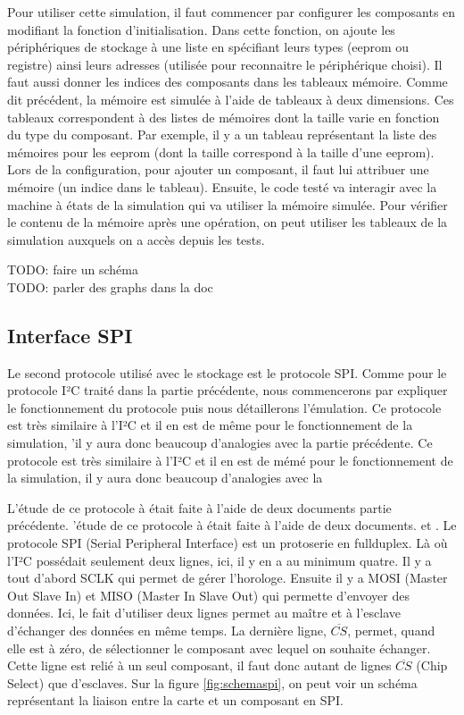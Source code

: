 \documentclass[a4paper]{article}
\begin{document}
Pour utiliser cette simulation, il faut commencer par configurer les composants
en modifiant la fonction d'initialisation. Dans cette fonction, on ajoute les
périphériques de stockage à une liste en spécifiant leurs types (eeprom ou
registre) ainsi leurs adresses (utilisée pour reconnaitre le périphérique
choisi). Il faut aussi donner les indices des composants dans les tableaux
mémoire. Comme dit précédent, la mémoire est simulée à l'aide de tableaux à deux
dimensions. Ces tableaux correspondent à des listes de mémoires dont la taille
varie en fonction du type du composant. Par exemple, il y a un tableau
représentant la liste des mémoires pour les eeprom (dont la taille correspond à
la taille d'une eeprom). Lors de la configuration, pour ajouter un composant, il
faut lui attribuer une mémoire (un indice dans le tableau). Ensuite, le code
testé va interagir avec la machine à états de la simulation qui va utiliser la
mémoire simulée. Pour vérifier le contenu de la mémoire après une opération, on
peut utiliser les tableaux de la simulation auxquels on a accès depuis les
tests.

TODO: faire un schéma\\
TODO: parler des graphs dans la doc

\subsection{Interface SPI}%

Le second protocole utilisé avec le stockage est le protocole SPI. Comme pour le
protocole I²C traité dans la partie précédente, nous commencerons par expliquer
le fonctionnement du protocole puis nous détaillerons l'émulation. Ce protocole
est très similaire à l'I²C et il en est de même pour le fonctionnement de la
simulation, 'il y aura donc beaucoup d'analogies avec la partie précédente.
Ce protocole est très similaire à l'I²C et il en est de mémé pour le
fonctionnement de la simulation, il y aura donc beaucoup d'analogies avec la

L'étude de ce protocole à était faite à l'aide de deux documents partie
précédente. 'étude de ce protocole à était faite à l'aide de deux documents.
\cite{dhaker2018introduction} et \cite{li2014design}. Le protocole SPI (Serial
Peripheral Interface) est un \gls{protoserie} en \gls{fullduplex}. Là où l'I²C
possédait seulement deux lignes, ici, il y en a au minimum quatre. Il y a tout
d'abord SCLK qui permet de gérer l'horologe. Ensuite il y a MOSI (Master Out
Slave In) et MISO (Master In Slave Out) qui permette d'envoyer des données. Ici,
le fait d'utiliser deux lignes permet au maître et à l'esclave d'échanger des
données en même temps. La dernière ligne, $\overline{CS}$, permet, quand elle
est à zéro, de sélectionner le composant avec lequel on souhaite échanger. Cette
ligne est relié à un seul composant, il faut donc autant de lignes
$\overline{CS}$ (Chip Select) que d'esclaves. Sur la figure \ref{fig:schemaspi},
on peut voir un schéma représentant la liaison entre la carte et un composant en
SPI.
\end{document}
